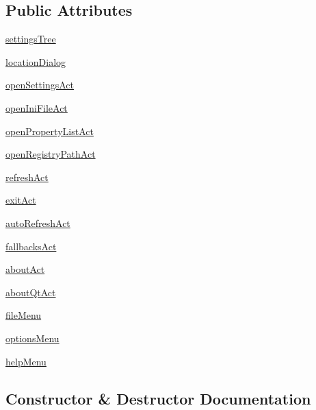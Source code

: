 \subsection*{Public Attributes}
\begin{DoxyCompactItemize}
\item 
\hyperlink{classsettingseditor_1_1MainWindow_a0409e84fd53fc6386f32368b6a84415f}{settings\+Tree}
\item 
\hyperlink{classsettingseditor_1_1MainWindow_a631064997897a7a59c0361d96a522e9d}{location\+Dialog}
\item 
\hyperlink{classsettingseditor_1_1MainWindow_a25d3e40478886b000caaf932de95945d}{open\+Settings\+Act}
\item 
\hyperlink{classsettingseditor_1_1MainWindow_a0fe8f90380d594d24da4705eace605c1}{open\+Ini\+File\+Act}
\item 
\hyperlink{classsettingseditor_1_1MainWindow_a7c716785938d0be36575179f27de5fe9}{open\+Property\+List\+Act}
\item 
\hyperlink{classsettingseditor_1_1MainWindow_aa3f3b9d19d6ea690c694e324d8939b4f}{open\+Registry\+Path\+Act}
\item 
\hyperlink{classsettingseditor_1_1MainWindow_aeb48539123f030b37e40382e873b4c0c}{refresh\+Act}
\item 
\hyperlink{classsettingseditor_1_1MainWindow_a678390c3f8ba6c17dbc2bf8ed863714a}{exit\+Act}
\item 
\hyperlink{classsettingseditor_1_1MainWindow_aba7bc41a27f27776fcb23ccf3c2377f4}{auto\+Refresh\+Act}
\item 
\hyperlink{classsettingseditor_1_1MainWindow_ae419cf3477f5aeb21d3f5fad63709441}{fallbacks\+Act}
\item 
\hyperlink{classsettingseditor_1_1MainWindow_adfeb6dcb2c9aca28a6cc5e69a2e6b24a}{about\+Act}
\item 
\hyperlink{classsettingseditor_1_1MainWindow_acc26d8c0bbd3e493e0be3ecbc2b8e7fe}{about\+Qt\+Act}
\item 
\hyperlink{classsettingseditor_1_1MainWindow_a07213bf0e770b721a3beee864c5042c5}{file\+Menu}
\item 
\hyperlink{classsettingseditor_1_1MainWindow_a9409c4b725906c8c6f3be7ef5195bba6}{options\+Menu}
\item 
\hyperlink{classsettingseditor_1_1MainWindow_a95827389989149f6361affb3317c44e0}{help\+Menu}
\end{DoxyCompactItemize}


\subsection{Constructor \& Destructor Documentation}
\hypertarget{classsettingseditor_1_1MainWindow_ad709a34c53d37614534fd2cde5de468a}{}
